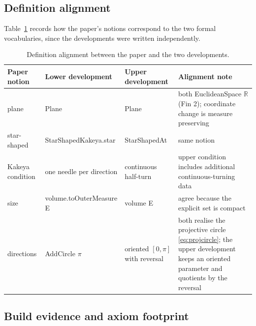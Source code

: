 \documentclass[11pt]{article}
\theoremstyle{plain}
\theoremstyle{definition}
\theoremstyle{remark}
\newcommand{\R}{\mathbb{R}}
\newcommand{\lean}[1]{%
  \begingroup\ttfamily\hyphenchar\font=-1\relax
  \def\_{\textunderscore\allowbreak}%
  #1\endgroup}
\begin{document}
\subsection{Definition alignment}

Table~\ref{tab:alignment} records how the paper's notions correspond to the two
formal vocabularies, since the developments were written independently.

\begin{table}[t]
\centering
\footnotesize
\begin{tabular}{@{}>{\raggedright\arraybackslash}p{}
                  >{\raggedright\arraybackslash}p{}
                  >{\raggedright\arraybackslash}p{}
                  >{\raggedright\arraybackslash}p{}@{}}
\toprule
Paper notion & Lower development & Upper development & Alignment note\\
\midrule
plane & \lean{Plane} & \lean{Plane} & both \lean{EuclideanSpace $\R$ (Fin 2)};
  coordinate change is measure preserving\\
star-shaped & \lean{StarShapedKakeya.star} & \lean{StarShapedAt}
  & same notion\\
Kakeya condition & one needle per direction & continuous half-turn
  & upper condition includes additional continuous-turning data\\
size & \lean{volume.toOuterMeasure E} & \lean{volume E}
  & agree because the explicit set is compact\\
directions & \lean{AddCircle $\pi$} & oriented $[0,\pi]$ with reversal
  & both realise the projective circle \eqref{eq:projcircle}; the upper
    development keeps an oriented parameter and quotients by the reversal\\
\bottomrule
\end{tabular}
\caption{Definition alignment between the paper and the two developments.}
\label{tab:alignment}
\end{table}

\subsection{Build evidence and axiom footprint}
\end{document}
